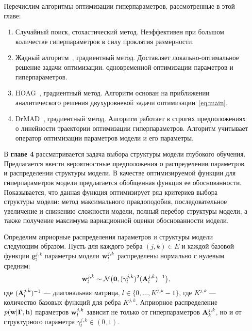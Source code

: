 \documentclass[11pt, a5paper]{dissert}
\theoremstyle{definition}
\begin{document}
{Перечислим алгоритмы оптимизации гиперпараметров, рассмотренные в этой главе:
\begin{enumerate}
\item Случайный поиск, стохастический метод. Неэффективен при большом количестве гиперпараметров в силу проклятия размерности.
\item Жадный алгоритм~\cite{greed_hyper}, градиентный метод. Доставляет локально-оптимальное решение задачи оптимизации.  одновременной оптимизации параметров и гиперпараметров.
\item HOAG~\cite{hyper_hoag}, градиентный метод. Алгоритм основан на приближении аналитического решения двухуровневой задачи оптимизации~\eqref{eq:main}.
\item DrMAD~\cite{hyper_mad}, градиентный метод. Алгоритм работает в строгих предположениях о линейности траектории оптимизации гиперпараметров. Алгоритм учитывает оператор оптимизации параметров модели и его параметры.
\end{enumerate}

В \textbf{главе 4}  рассматривается задача выбора структуры модели глубокого обучения. Предлагается ввести вероятностные предположения о распределении параметров и распределении структуры модели. В качестве оптимизируемой функции для гиперпараметров модели предлагается обобщенная функция ее обоснованности. Показывается, что данная функция оптимизирует ряд критериев выбора структуры модели: метод максимального правдоподобия, последовательное увеличение и снижению сложности модели, полный перебор структуры модели, а также получение максимума вариационной оценки обоснованности модели.

Определим априорные распределения параметров и структуры модели следующим образом.
Пусть для каждого ребра $(j,k) \in E$ и каждой базовой функции $\mathbf{g}^{j,k}_l$ параметры модели $\mathbf{w}^{j,k}_l$ распределены нормально с нулевым средним:
\[
    \mathbf{w}^{j,k}_l \sim \mathcal{N}\bigl(\mathbf{0}, (\gamma^{j,k}_l)^2(\mathbf{A}^{j,k}_l)^{-1}\bigr),
\]
где $ (\mathbf{A}^{j,k}_l)^{-1}$ --- диагональная матрица, $l \in \{0,\dots,K^{j,k}-1\}$, где $K^{j,k}$ --- количество базовых функций для ребра $K^{j,k}$. Априорное распределение $p(\mathbf{w}|\boldsymbol{\Gamma}, \mathbf{h})$ параметров $\mathbf{w}^{j,k}_l$ зависит не только от гиперпараметров $\mathbf{A}_k^{j,k}$, но и от структурного параметра $\gamma^{j,k}_l \in (0,1)$.


}
\end{document}
